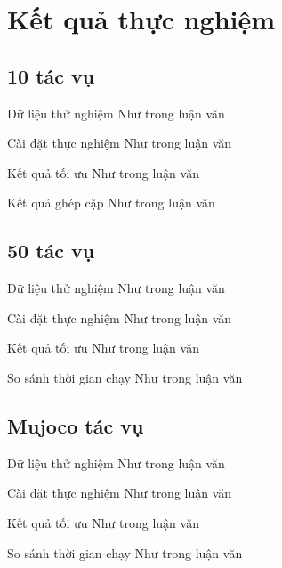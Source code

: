 \section{Kết quả thực nghiệm}

\subsection{10 tác vụ}
    \begin{frame}{Dữ liệu thử nghiệm}
        Như trong luận văn
    \end{frame}
    \begin{frame}{Cài đặt thực nghiệm}
        Như trong luận văn
    \end{frame}
    \begin{frame}{Kết quả tối ưu}
        Như trong luận văn
    \end{frame}
    \begin{frame}{Kết quả ghép cặp}
        Như trong luận văn
    \end{frame}

\subsection{50 tác vụ}
    \begin{frame}{Dữ liệu thử nghiệm}
        Như trong luận văn
    \end{frame}
    \begin{frame}{Cài đặt thực nghiệm}
        Như trong luận văn
    \end{frame}
    \begin{frame}{Kết quả tối ưu}
        Như trong luận văn
    \end{frame}
    \begin{frame}{So sánh thời gian chạy}
        Như trong luận văn
    \end{frame}

\subsection{Mujoco tác vụ}
    \begin{frame}{Dữ liệu thử nghiệm}
        Như trong luận văn
    \end{frame}
    \begin{frame}{Cài đặt thực nghiệm}
        Như trong luận văn
    \end{frame}
    \begin{frame}{Kết quả tối ưu}
        Như trong luận văn
    \end{frame}
    \begin{frame}{So sánh thời gian chạy}
        Như trong luận văn
    \end{frame}
    
